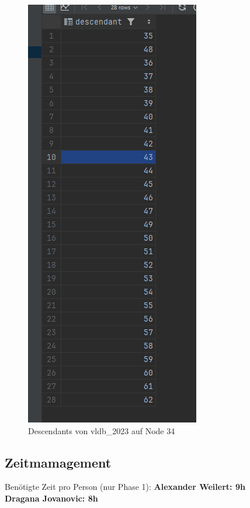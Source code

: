 \documentclass[11pt]{scrartcl}
\begin{document}
\begin{figure}[H]
\begin{minipage}[b]{.4\linewidth}
\begin{center}
            \includegraphics[width=\linewidth]{img_3.png}
            \caption{Descendants von vldb_2023 auf Node 34}
        \end{center}
    \end{minipage}
\end{figure}

\subsection*{Zeitmamagement}

Benötigte Zeit pro Person (nur Phase 1):
\textbf{Alexander Weilert: 9h} \\
\textbf{Dragana Jovanovic: 8h}
\end{document}
